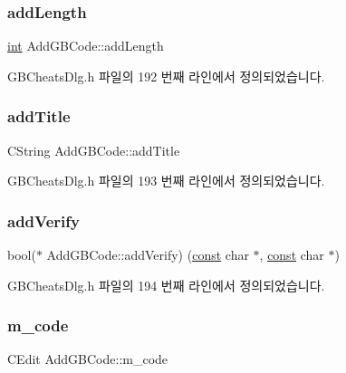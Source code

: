 \subsubsection{\texorpdfstring{add\+Length}{addLength}}
{\footnotesize\ttfamily \mbox{\hyperlink{_util_8cpp_a0ef32aa8672df19503a49fab2d0c8071}{int}} Add\+G\+B\+Code\+::add\+Length}



G\+B\+Cheats\+Dlg.\+h 파일의 192 번째 라인에서 정의되었습니다.

\mbox{\label{class_add_g_b_code_a436954b9aea5bac8b7063a6939f829ae}} 
\subsubsection{\texorpdfstring{add\+Title}{addTitle}}
{\footnotesize\ttfamily C\+String Add\+G\+B\+Code\+::add\+Title}



G\+B\+Cheats\+Dlg.\+h 파일의 193 번째 라인에서 정의되었습니다.

\mbox{\label{class_add_g_b_code_a3c81ddb0e728491632442e95218f40cf}} 
\subsubsection{\texorpdfstring{add\+Verify}{addVerify}}
{\footnotesize\ttfamily bool($\ast$ Add\+G\+B\+Code\+::add\+Verify) (\mbox{\hyperlink{getopt1_8c_a2c212835823e3c54a8ab6d95c652660e}{const}} char $\ast$, \mbox{\hyperlink{getopt1_8c_a2c212835823e3c54a8ab6d95c652660e}{const}} char $\ast$)}



G\+B\+Cheats\+Dlg.\+h 파일의 194 번째 라인에서 정의되었습니다.

\mbox{\label{class_add_g_b_code_a1336063b1498bee29c2a9df7273d8ca9}} 
\subsubsection{\texorpdfstring{m\+\_\+code}{m\_code}}
{\footnotesize\ttfamily C\+Edit Add\+G\+B\+Code\+::m\+\_\+code}



